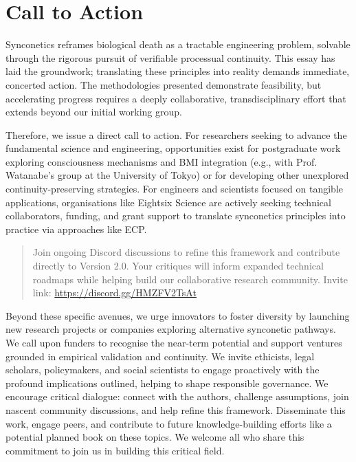 \documentclass[10pt]{article}
\begin{document}
\begin{sloppypar}

  \section{Call to Action}
  \label{sec:call-to-action}

  Synconetics reframes biological death as a tractable engineering problem, solvable through the rigorous pursuit of verifiable processual continuity. This essay has laid the groundwork; translating these principles into reality demands immediate, concerted action. The methodologies presented demonstrate feasibility, but accelerating progress requires a deeply collaborative, transdisciplinary effort that extends beyond our initial working group.

  Therefore, we issue a direct call to action. For researchers seeking to advance the fundamental science and engineering, opportunities exist for postgraduate work exploring consciousness mechanisms and BMI integration (e.g., with Prof. Watanabe’s group at the University of Tokyo) or for developing other unexplored continuity-preserving strategies. For engineers and scientists focused on tangible applications, organisations like Eightsix Science are actively seeking technical collaborators, funding, and grant support to translate synconetics principles into practice via approaches like ECP.

  \begin{quote}
    Join ongoing Discord discussions to refine this framework and contribute directly to Version 2.0. Your critiques will inform expanded technical roadmaps while helping build our collaborative research community. Invite link: \url{https://discord.gg/HMZFV2TsAt}
  \end{quote}

  Beyond these specific avenues, we urge innovators to foster diversity by launching new research projects or companies exploring alternative synconetic pathways. We call upon funders to recognise the near-term potential and support ventures grounded in empirical validation and continuity. We invite ethicists, legal scholars, policymakers, and social scientists to engage proactively with the profound implications outlined, helping to shape responsible governance. We encourage critical dialogue: connect with the authors, challenge assumptions, join nascent community discussions, and help refine this framework. Disseminate this work, engage peers, and contribute to future knowledge-building efforts like a potential planned book on these topics. We welcome all who share this commitment to join us in building this critical field.


  \pagebreak
  
  
  \nocite{*}

\end{sloppypar}
\end{document}
